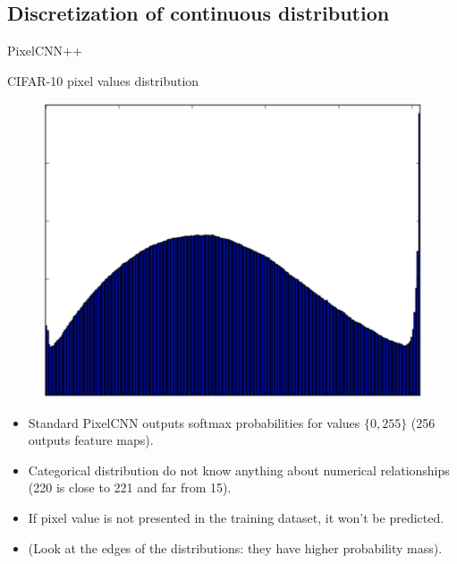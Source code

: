 \subsection{Discretization of continuous distribution}
\begin{frame}{PixelCNN++}
	\begin{block}{CIFAR-10 pixel values distribution}
		\begin{figure}
			\includegraphics[width=0.3\linewidth]{figs/pixelcnn++_pixels_distr}
		\end{figure}
	\end{block}
	\vspace{-0.5cm}
	\begin{itemize}
		\item Standard PixelCNN outputs softmax probabilities for values $\{0, 255\}$ (256 outputs feature maps). 
		\item Categorical distribution do not know anything about numerical relationships (220 is close to 221 and far from 15).
		\item If pixel value is not presented in the training dataset, it won't be predicted.
		\item (Look at the edges of the distributions: they have higher probability mass).
	\end{itemize}
\end{frame}
